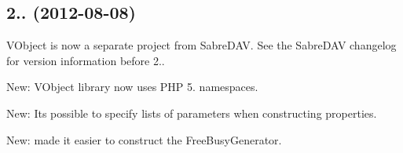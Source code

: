 \subsection*{2.. (2012-\/08-\/08) }


\begin{DoxyItemize}
\item V\+Object is now a separate project from Sabre\+D\+AV. See the Sabre\+D\+AV changelog for version information before 2..
\item New\+: V\+Object library now uses P\+HP 5. namespaces.
\item New\+: It\textquotesingle{}s possible to specify lists of parameters when constructing properties.
\item New\+: made it easier to construct the Free\+Busy\+Generator. 
\end{DoxyItemize}